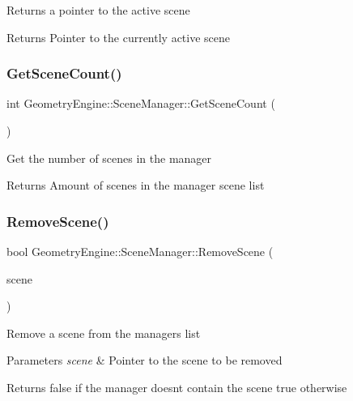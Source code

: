 Returns a pointer to the active scene \begin{DoxyReturn}{Returns}
Pointer to the currently active scene 
\end{DoxyReturn}
\mbox{\label{class_geometry_engine_1_1_scene_manager_a1dc46b5707a779a3fcc3881bb7c8f3f6}} 
\subsubsection{\texorpdfstring{GetSceneCount()}{GetSceneCount()}}
{\footnotesize\ttfamily int Geometry\+Engine\+::\+Scene\+Manager\+::\+Get\+Scene\+Count (\begin{DoxyParamCaption}{ }\end{DoxyParamCaption})\hspace{0.3cm}{\ttfamily [inline]}}

Get the number of scenes in the manager \begin{DoxyReturn}{Returns}
Amount of scenes in the manager scene list 
\end{DoxyReturn}
\mbox{\label{class_geometry_engine_1_1_scene_manager_a31890e580c47aceaeab795e8886bcf82}} 
\subsubsection{\texorpdfstring{RemoveScene()}{RemoveScene()}\hspace{0.1cm}{\footnotesize\ttfamily [1/2]}}
{\footnotesize\ttfamily bool Geometry\+Engine\+::\+Scene\+Manager\+::\+Remove\+Scene (\begin{DoxyParamCaption}\item[{\mbox{\hyperlink{class_geometry_engine_1_1_geometry_scene_1_1_geometry_scene}{Geometry\+Scene\+::\+Geometry\+Scene}} $\ast$}]{scene }\end{DoxyParamCaption})}

Remove a scene from the manager\textquotesingle{}s list 
\begin{DoxyParams}{Parameters}
{\em scene} & Pointer to the scene to be removed \\
\hline
\end{DoxyParams}
\begin{DoxyReturn}{Returns}
false if the manager doesn\textquotesingle{}t contain the scene true otherwise 
\end{DoxyReturn}
\mbox{\label{class_geometry_engine_1_1_scene_manager_ad8ca79bfce997398df387dd42d6e4312}} 
